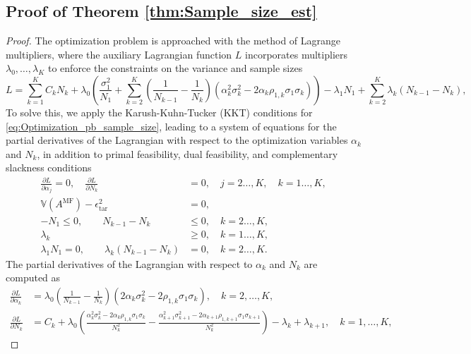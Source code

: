 \subsection{Proof of Theorem \ref{thm:Sample_size_est}}
\begin{proof}
The optimization problem is approached with the method of Lagrange multipliers, where the auxiliary Lagrangian function $L$ incorporates multipliers $\lambda_0,\ldots, \lambda_K$ to enforce the constraints on the variance and sample sizes
%
\[
L = \sum_{k=1}^K C_kN_k +\lambda_0 \left(\frac{\sigma_1^2}{N_1} + \sum_{k=2}^K \left(\frac{1}{N_{k-1}} - \frac{1}{N_k}\right)\left(\alpha_k^2\sigma_k^2 - 2\alpha_k\rho_{1,k}\sigma_1\sigma_k\right)\right)-\lambda_1 N_1+\sum_{k=2}^K\lambda_k(N_{k-1} - N_k),
\]
%
To solve this, we apply the Karush-Kuhn-Tucker (KKT) conditions for \eqref{eq:Optimization_pb_sample_size}, leading to a system of equations for the partial derivatives of the Lagrangian with respect to the optimization variables $\alpha_k$ and $N_k$,  in addition to  primal feasibility, dual feasibility, and complementary slackness conditions
%
\begin{align*}
\frac{\partial L}{\partial \alpha_j}=0,\quad \frac{\partial L}{\partial N_k}&=0,\quad j=2\ldots,K, \quad k=1\ldots,K,\\
\mathbb{V}\left(A^{\text{MF}}\right)- \epsilon_{\text{tar}}^2 &= 0,\\
   -N_1\le 0,\qquad N_{k-1}-N_k&\le 0, \quad k=2\ldots,K,\\
    \lambda_k &\ge 0,\quad k=1\ldots,K,\\ 
    \lambda_1 N_1=0,\qquad\lambda_k(N_{k-1}-N_k)&=0,\quad k=2\ldots,K.
\end{align*}
%
The partial derivatives of the Lagrangian with respect to $\alpha_k$ and $N_k$ are computed as
%
\begin{align*}
    \frac{\partial L}{\partial \alpha_k}&=\lambda_0\left(\frac{1}{N_{k-1}} - \frac{1}{N_k}\right)\left(2\alpha_k\sigma_k^2 - 2\rho_{1,k}\sigma_1\sigma_k\right),\quad k=2,\dots,K,\\
    \frac{\partial L}{\partial N_k}&=C_k+\lambda_0\left(\frac{\alpha_k^2\sigma_k^2 - 2\alpha_k\rho_{1,k}\sigma_1\sigma_k}{N_k^2}-\frac{\alpha_{k+1}^2\sigma_{k+1}^2 - 2\alpha_{k+1}\rho_{1,k+1}\sigma_1\sigma_{k+1}}{N_k^2}\right)-\lambda_k+\lambda_{k+1}, \quad k=1,\dots,K,

\end{align*}
\end{proof}
